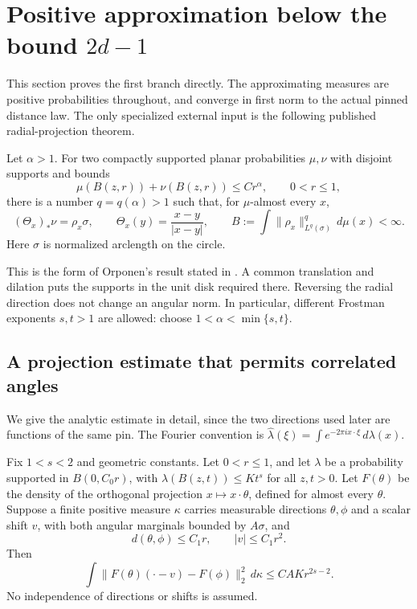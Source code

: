 \section{Positive approximation below the bound \texorpdfstring{$2d-1$}{2d-1}}
\label{human:coherent-section}

This section proves the first branch directly. The approximating measures
are positive probabilities throughout, and converge in first norm to the
actual pinned distance law. The only specialized external input is the
following published radial-projection theorem.

\begin{theorem}
\label{human:radial}
Let \(\alpha>1\). For two compactly supported planar probabilities
\(\mu,\nu\) with disjoint supports and bounds
\[
 \mu(B(z,r))+\nu(B(z,r))\le C r^\alpha,
 \qquad 0<r\le1,
\]
there is a number \(q=q(\alpha)>1\) such that, for
\(\mu\)-almost every \(x\),
\begin{equation}\label{human:radial-moment}
 (\Theta_x)_*\nu=\rho_x\sigma,
 \qquad \Theta_x(y)=\frac{x-y}{|x-y|},
 \qquad
 B:=\int\|\rho_x\|_{L^q(\sigma)}^q\,d\mu(x)<\infty.
\end{equation}
Here \(\sigma\) is normalized arclength on the circle.
\end{theorem}

This is the form of Orponen's result \cite{orponen} stated in
\cite[Theorem 3.7]{giow}. A common translation and dilation puts the
supports in the unit disk required there. Reversing the radial direction
does not change an angular norm. In particular, different Frostman
exponents \(s,t>1\) are allowed: choose
\(1<\alpha<\min\{s,t\}\).

\subsection{A projection estimate that permits correlated angles}

We give the analytic estimate in detail, since the two directions used
later are functions of the same pin. The Fourier convention is
\(\widehat\lambda(\xi)=\int e^{-2\pi i x\cdot\xi}\,d\lambda(x)\).

\begin{lemma}\label{human:bandlemma}
Fix \(1<s<2\) and geometric constants. Let \(0<r\le1\), and let
\(\lambda\) be a probability supported in \(B(0,C_0r)\), with
\(\lambda(B(z,t))\le Kt^s\) for all \(z,t>0\).
Let \(F(\theta)\) be the density of the orthogonal projection
\(x\mapsto x\cdot\theta\), defined for almost every \(\theta\).
Suppose a finite positive measure \(\kappa\) carries measurable
directions \(\theta,\phi\) and a scalar shift \(v\), with both
angular marginals bounded by \(A\sigma\), and
\[
 d(\theta,\phi)\le C_1r,\qquad |v|\le C_1r^2.
\]
Then
\begin{equation}\label{human:bandbound}
 \int\|F(\theta)(\cdot-v)-F(\phi)\|_2^2\,d\kappa
 \le C AKr^{2s-2}.
\end{equation}
No independence of directions or shifts is assumed.
\end{lemma}

